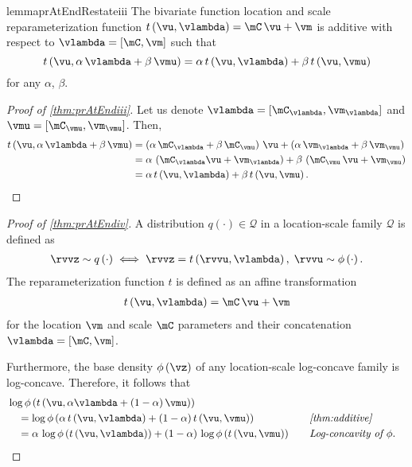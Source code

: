 \begin{restatable}[]{lemma}{prAtEndRestateiii}\label{thm:prAtEndiii}\label {thm:additive} The bivariate function location and scale reparameterization function \( t\left (\vu , \vlambda \right ) = \mC \,\vu + \vm \) is additive with respect to \(\vlambda =\left [\mC , \vm \right ]\) such that \[ t\left (\vu , \alpha \,\vlambda + \beta \,\vmu \right ) = \alpha \,t\left (\vu , \vlambda \right ) + \beta \,t\left (\vu , \vmu \right ) \] for any \(\alpha \), \(\beta \).\end{restatable}
\label{proofsection:prAtEndiii}\begin{proof}[Proof of \autoref{thm:prAtEndiii}]\label{proof:prAtEndiii}Let us denote \(\vlambda =\left [\mC _{\vlambda }, \vm _{\vlambda }\right ]\) and \(\vmu = \left [\mC _{\vmu }, \vm _{\vmu }\right ]\). Then, \begin {alignat}{2} t\left (\vu , \alpha \,\vlambda + \beta \,\vmu \right ) &= \left (\alpha \,\mC _{\vlambda } + \beta \,\mC _{\vmu }\right )\,\vu + \left (\alpha \,\vm _{\vlambda } + \beta \,\vm _{\vmu }\right ) \nonumber \\ &= \alpha \,\left (\mC _{\vlambda }\vu + \vm _{\vlambda }\right ) + \beta \,\left (\mC _{\vmu }\,\vu + \vm _{\vmu }\right ) \nonumber \\ &= \alpha \,t\left (\vu , \vlambda \right ) + \beta \,t\left (\vu , \vmu \right ). \nonumber \end {alignat}\end{proof}
\prAtEndRestateiv*
\label{proofsection:prAtEndiv}\begin{proof}[Proof of \autoref{thm:prAtEndiv}]\label{proof:prAtEndiv}A distribution \(q\left (\cdot \right ) \in \mathcal {Q}\) in a location-scale family \(\mathcal {Q}\) is defined as \begin {align*} \rvvz \sim q\left (\cdot \right ) \iff \rvvz = t\left (\rvvu , \vlambda \right ),\; \rvvu \sim \phi \left (\cdot \right ). \end {align*} The reparameterization function \(t\) is defined as an affine transformation \begin {align*} t\left (\vu , \vlambda \right ) = \mC \,\vu + \vm \end {align*} for the location \(\vm \) and scale \(\mC \) parameters and their concatenation \(\vlambda = \left [\mC , \vm \right ]\). \par Furthermore, the base density \(\phi \left (\vz \right )\) of any location-scale log-concave family is log-concave. Therefore, it follows that \begin {alignat}{2} &\log \phi \left (t\left (\vu , \alpha \vlambda + (1 - \alpha )\,\vmu \right )\right ) \nonumber \\ &\quad = \log \phi \left ( \alpha \,t\left (\vu , \vlambda \right ) + (1 - \alpha )\,t\left (\vu , \vmu \right )\right ) &&\quad \text {\textit {\cref {thm:additive}}} \nonumber \\ &\quad = \alpha \,\log \phi \left (t\left (\vu , \vlambda \right )\right ) + (1 - \alpha )\,\log \phi \left (t\left (\vu , \vmu \right )\right ) &&\quad \text {\textit {Log-concavity of \(\phi \)}}. \nonumber \end {alignat}\end{proof}
